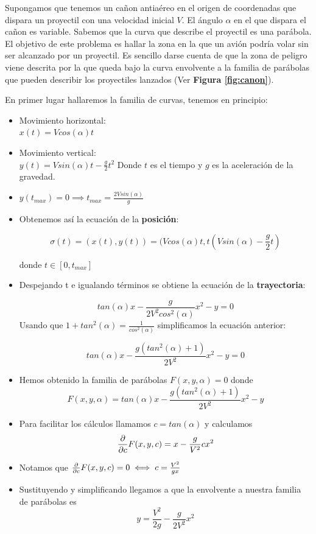 \documentclass{mathnotes}
\begin{document}
\begin{example}
Supongamos que tenemos un cañon antiaéreo en el origen de coordenadas que dispara un proyectil con una velocidad inicial $V$. El ángulo $\alpha$ en el que dispara el cañon es variable. Sabemos que la curva que describe el proyectil es una parábola. El objetivo de este problema es hallar la zona en la que un avión podría volar sin ser alcanzado por un proyectil. Es sencillo darse cuenta de que la zona de peligro viene descrita por la que queda bajo la curva envolvente a la familia de parábolas que pueden describir los proyectiles lanzados (Ver \textbf{Figura \ref{fig:canon}}). 

En primer lugar hallaremos la familia de curvas, tenemos en principio:
\begin{itemize}
\item Movimiento horizontal:\\ $x(t) = Vcos(\alpha)t$
\item Movimiento vertical:\\ $y(t) = Vsin(\alpha)t-\frac{g}{2}t^2$
Donde $t$ es el tiempo y $g$ es la aceleración de la gravedad.
\item $y(t_{max}) = 0 \implies t_{max} = \frac{2Vsin(\alpha)}{g}$
\item Obtenemos así la ecuación de la \textbf{posición}:

$$\sigma(t) = (x(t), y(t)) = (Vcos(\alpha)t, t(Vsin(\alpha)-\frac{g}{2}t)$$ 

donde $t\in[0, t_{max}]$
\item Despejando t e igualando términos se obtiene la ecuación de la \textbf{trayectoria}:

$$tan(\alpha)x-\frac{g}{2V^2cos^2(\alpha)}x^2-y = 0$$
Usando que $1+tan^2(\alpha) = \frac{1}{cos^2(\alpha)}$ simplificamos la ecuación anterior:

$$tan(\alpha)x - \frac{g(tan^2(\alpha)+1)}{2V^2}x^2-y = 0$$
\item Hemos obtenido la familia de parábolas $F(x,y,\alpha) = 0$ donde
$$F(x,y, \alpha) = tan(\alpha)x - \frac{g(tan^2(\alpha)+1)}{2V^2}x^2-y$$
\item Para facilitar los cálculos llamamos $c=tan(\alpha)$ y calculamos
$$\frac{\partial}{\partial c}F(x,y,c) = x-\frac{g}{V^2}cx^2$$
\item Notamos que $\frac{\partial}{\partial c}F(x,y,c) = 0 \iff c=\frac{V^2}{gx}$
\item Sustituyendo y simplificando llegamos a que la envolvente a nuestra familia de parábolas es
$$y=\frac{V^2}{2g}-\frac{g}{2V^2}x^2$$
\end{itemize}
\end{example}
\end{document}
